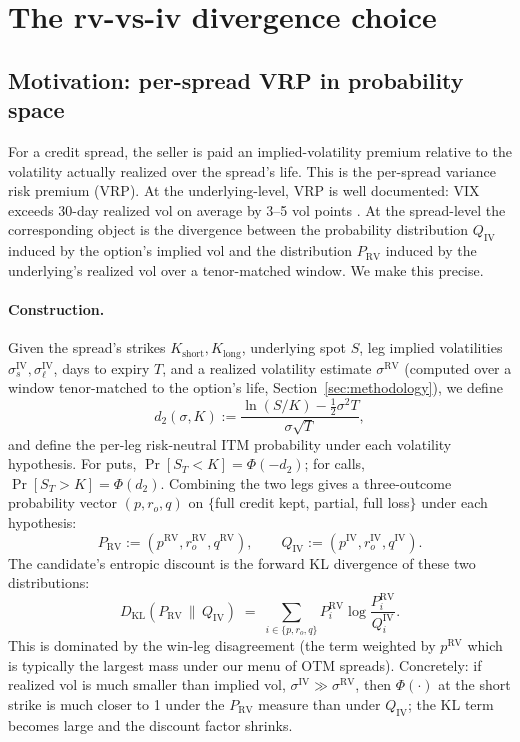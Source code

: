 \documentclass[11pt]{article}
\newcommand{\KL}{D_{\mathrm{KL}}}
\theoremstyle{definition}
\theoremstyle{remark}
\begin{document}
\section{The rv-vs-iv divergence choice}
\label{sec:rvvsiv-choice}

\subsection{Motivation: per-spread VRP in probability space}

For a credit spread, the seller is paid an implied-volatility premium
relative to the volatility actually realized over the spread's life.
This is the per-spread variance risk premium (VRP). At the
underlying-level, VRP is well documented: VIX exceeds 30-day realized vol
on average by 3--5 vol points \citep{bollerslev2009}. At the
spread-level the corresponding object is the divergence between the
probability distribution $Q_{\mathrm{IV}}$ induced by the option's
implied vol and the distribution $P_{\mathrm{RV}}$ induced by the
underlying's realized vol over a tenor-matched window. We make this
precise.

\paragraph{Construction.}
Given the spread's strikes $K_{\text{short}}, K_{\text{long}}$,
underlying spot $S$, leg implied volatilities $\sigma^{\mathrm{IV}}_{s},
\sigma^{\mathrm{IV}}_{\ell}$, days to expiry $T$, and a realized
volatility estimate $\sigma^{\mathrm{RV}}$ (computed over a window
tenor-matched to the option's life, Section~\ref{sec:methodology}), we
define
\begin{equation}
d_2(\sigma, K) := \frac{\ln(S/K) - \tfrac{1}{2} \sigma^2 T}{\sigma \sqrt{T}},
\end{equation}
and define the per-leg risk-neutral ITM probability under each volatility
hypothesis. For puts, $\Pr[S_T < K] = \Phi(-d_2)$; for calls,
$\Pr[S_T > K] = \Phi(d_2)$. Combining the two legs gives a three-outcome
probability vector $(p, r_o, q)$ on $\{$full credit kept, partial,
full loss$\}$ under each hypothesis:
\begin{equation}
P_{\mathrm{RV}} := (p^{\mathrm{RV}}, r_o^{\mathrm{RV}}, q^{\mathrm{RV}}), \qquad
Q_{\mathrm{IV}} := (p^{\mathrm{IV}}, r_o^{\mathrm{IV}}, q^{\mathrm{IV}}).
\end{equation}
The candidate's entropic discount is the forward KL divergence of these
two distributions:
\begin{equation}
\KL(P_{\mathrm{RV}} \,\|\, Q_{\mathrm{IV}}) \;=\;
\sum_{i \in \{p, r_o, q\}} P^{\mathrm{RV}}_i \log \frac{P^{\mathrm{RV}}_i}{Q^{\mathrm{IV}}_i}.
\end{equation}
This is dominated by the win-leg disagreement (the term weighted by
$p^{\mathrm{RV}}$ which is typically the largest mass under our menu
of OTM spreads). Concretely: if realized vol is much smaller than
implied vol, $\sigma^{\mathrm{IV}} \gg \sigma^{\mathrm{RV}}$, then
$\Phi(\cdot)$ at the short strike is much closer to 1 under the
$P_{\mathrm{RV}}$ measure than under $Q_{\mathrm{IV}}$; the KL term
becomes large and the discount factor shrinks.
\end{document}

